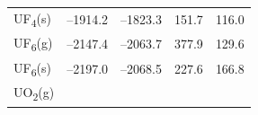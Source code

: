 \documentclass[
  9pt,
]{extbook}
\theoremstyle{definition}
\theoremstyle{definition}
\theoremstyle{definition}
\theoremstyle{remark}
\begin{document}
\begin{longtable}[]{@{}lllll@{}}
\begin{minipage}[t]{0.10\columnwidth}\raggedright
UF\textsubscript{4}(s)\strut
\end{minipage} & \begin{minipage}[t]{0.19\columnwidth}\raggedright
--1914.2\strut
\end{minipage} & \begin{minipage}[t]{0.20\columnwidth}\raggedright
--1823.3\strut
\end{minipage} & \begin{minipage}[t]{0.18\columnwidth}\raggedright
151.7\strut
\end{minipage} & \begin{minipage}[t]{0.18\columnwidth}\raggedright
116.0\strut
\end{minipage}\tabularnewline
\begin{minipage}[t]{0.10\columnwidth}\raggedright
UF\textsubscript{6}(g)\strut
\end{minipage} & \begin{minipage}[t]{0.19\columnwidth}\raggedright
--2147.4\strut
\end{minipage} & \begin{minipage}[t]{0.20\columnwidth}\raggedright
--2063.7\strut
\end{minipage} & \begin{minipage}[t]{0.18\columnwidth}\raggedright
377.9\strut
\end{minipage} & \begin{minipage}[t]{0.18\columnwidth}\raggedright
129.6\strut
\end{minipage}\tabularnewline
\begin{minipage}[t]{0.10\columnwidth}\raggedright
UF\textsubscript{6}(s)\strut
\end{minipage} & \begin{minipage}[t]{0.19\columnwidth}\raggedright
--2197.0\strut
\end{minipage} & \begin{minipage}[t]{0.20\columnwidth}\raggedright
--2068.5\strut
\end{minipage} & \begin{minipage}[t]{0.18\columnwidth}\raggedright
227.6\strut
\end{minipage} & \begin{minipage}[t]{0.18\columnwidth}\raggedright
166.8\strut
\end{minipage}\tabularnewline
\begin{minipage}[t]{0.10\columnwidth}\raggedright
UO\textsubscript{2}(g)\strut

\end{minipage}
\end{longtable}
\end{document}
